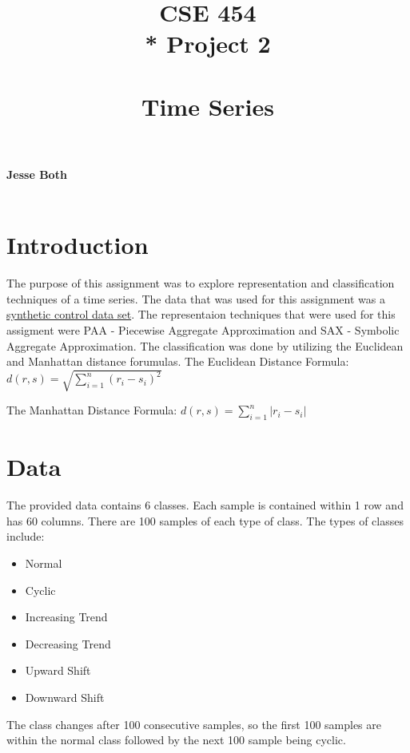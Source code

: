 \documentclass{article}
\title{\Huge{\textbf{CSE 454}  \\* Project 2 \\~\\ \textbf{Time Series}}}
\date{} %
\begin{document}
    \maketitle
    \vfill 
    {\Large\centering\textbf{Jesse Both  \\~\\}\par}

    {\Large{}\par}
    {\large\centering{\today}\par}

    \newpage
    \begin{center}
        \tableofcontents
    \end{center}
\newpage
\setcounter{secnumdepth}{-1}


\section{Introduction}
The purpose of this assignment was to explore representation and classification
techniques of a time series.  The data that was used for this assignment was
a \href{https://archive.ics.uci.edu/ml/datasets/Synthetic+Control+Chart+Time+Series}{synthetic control data set}.
The representaion techniques that were used for this assigment were PAA - Piecewise
Aggregate Approximation and SAX - Symbolic Aggregate Approximation. The classification
was done by utilizing the Euclidean and Manhattan distance forumulas.
\newline
\newline
\noindent
The Euclidean Distance Formula:
$d\left( r,s\right)   = \sqrt {\sum _{i=1}^{n}  \left( r_{i}-s_{i}\right)^2 } $

\noindent
The Manhattan Distance Formula:
$d\left( r,s\right)   = {\sum _{i=1}^{n}  \lvert r_{i}-s_{i}\rvert} $



\section{Data}
The provided data contains 6 classes.  Each sample is contained within 1
row and has 60 columns.  There are 100 samples of each type of class. 
The types of classes include:
\begin{itemize}
    \item Normal
    \item Cyclic
    \item Increasing Trend
    \item Decreasing Trend
    \item Upward Shift
    \item Downward Shift
  \end{itemize}
The class changes after 100 consecutive samples, so the first 100 samples 
are within the normal class followed by the next 100 sample being cyclic.
\end{document}

